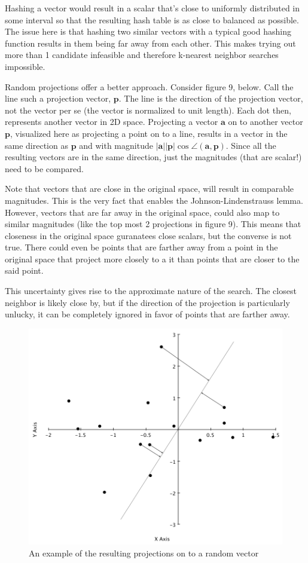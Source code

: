 \documentclass{article}
\begin{document}
Hashing a vector would result in a scalar that's close to uniformly distributed
in some interval so that the resulting hash table is as close to balanced as
possible. The issue here is that hashing two similar vectors with a typical
good hashing function results in them being far away from each other.
This makes trying out more than 1 candidate infeasible and therefore k-nearest
neighbor searches impossible.

Random projections offer a better approach. Consider figure 9, below.
Call the line such a projection vector, $\mathbf{p}$. The line is the direction
of the projection vector, not the vector per se (the vector is normalized to
unit length). Each dot then, represents another vector in 2D space.
Projecting a vector $\mathbf{a}$ on to another vector $\mathbf{p}$, visualized 
here as projecting a point on to a line, results in a vector in the same
direction as $\mathbf{p}$ and with magnitude $|\mathbf{a}| |\mathbf{p}| \cos \angle(\mathbf{a}, \mathbf{p})$.
Since all the resulting vectors are in the same direction, just the magnitudes (that
are scalar!) need to be compared.

Note that vectors that are close in the original space, will result in comparable
magnitudes. This is the very fact that enables the Johnson-Lindenstrauss lemma.
However, vectors that are far away in the original space, could also map to similar
magnitudes (like the top most 2 projections in figure 9). This means that
closeness in the original space guranatees close scalars, but the converse is
not true.
There could even be points that are farther away from a point in the original space
that project more closely to a it than points that are closer to the said point.

This uncertainty gives rise to the approximate nature of the search. The
closest neighbor is likely close by, but if the direction of the projection is
particularly unlucky, it can be completely ignored in favor of points that are
farther away.

\begin{figure}[H]
    \caption{An example of the resulting projections on to a random vector}
    \includegraphics[scale=0.8]{proj.png}
\end{figure}
\end{document}
